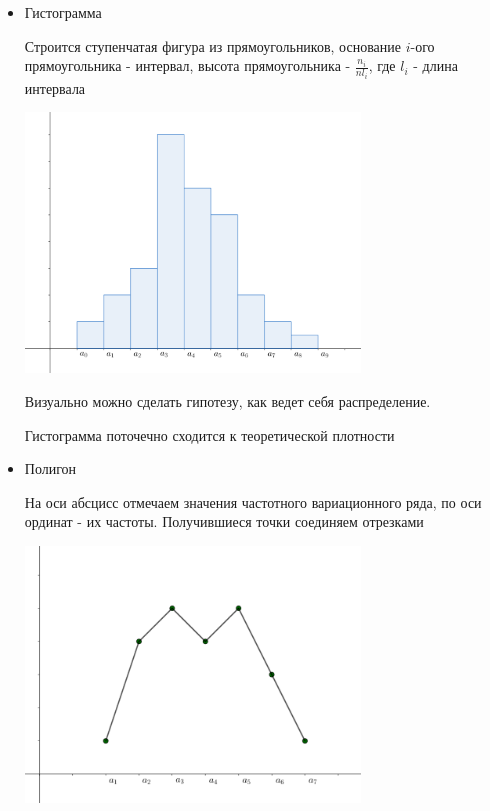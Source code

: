 \documentclass[12pt]{article}
\begin{document}
\begin{itemize}
    \item Гистограмма

    Строится ступенчатая фигура из прямоугольников, основание $i$-ого прямоугольника - интервал, 
    высота прямоугольника - $\frac{n_i}{n l_i}$, где $l_i$ - длина интервала

    \begin{center}
        \includegraphics[width=0.7\textwidth]{mathstat/images/mathstat_2025_02_11_1}
    \end{center}

    Визуально можно сделать гипотезу, как ведет себя распределение. 

    \begin{MyTheorem}
        \Ths Гистограмма поточечно сходится к теоретической плотности
    \end{MyTheorem}

    \item Полигон

    На оси абсцисс отмечаем значения частотного вариационного ряда, по оси ординат - их частоты. 
    Получившиеся точки соединяем отрезками

    \begin{center}
        \includegraphics[width=0.7\textwidth]{mathstat/images/mathstat_2025_02_11_2}
    \end{center}


\end{itemize}
\end{document}

